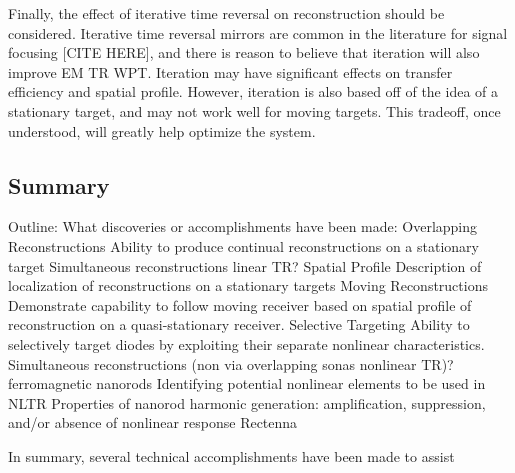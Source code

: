 Finally, the effect of iterative time reversal on reconstruction should be considered.  Iterative time reversal mirrors are common in the literature for signal focusing [CITE HERE], and there is reason to believe that iteration will also improve EM TR WPT.  Iteration may have significant effects on transfer efficiency and spatial profile.  However, iteration is also based off of the idea of a stationary target, and may not work well for moving targets.  This tradeoff, once understood, will greatly help optimize the system.



\subsection{Summary}

Outline:
	What discoveries or accomplishments have been made:
Overlapping Reconstructions
Ability to produce continual reconstructions on a stationary target
Simultaneous reconstructions {linear TR}?
Spatial Profile
Description of localization of reconstructions on a stationary targets
Moving Reconstructions
Demonstrate capability to follow moving receiver based on spatial profile of reconstruction on a quasi-stationary receiver.
Selective Targeting
Ability to selectively target diodes by exploiting their separate nonlinear characteristics.
Simultaneous reconstructions (non via overlapping sonas {nonlinear TR})?
ferromagnetic nanorods
Identifying potential nonlinear elements to be used in NLTR
Properties of nanorod harmonic generation: amplification, suppression, and/or absence of nonlinear response
Rectenna

In summary, several technical accomplishments have been made to assist
